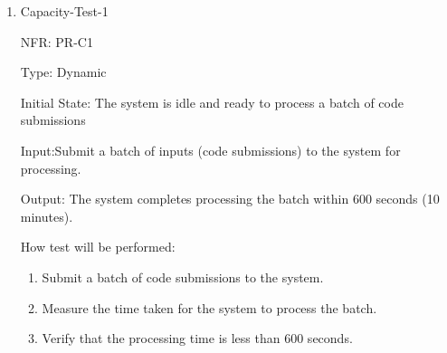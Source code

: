 \documentclass[12pt, titlepage]{article}
\begin{document}
\begin{enumerate}
  \item{Capacity-Test-1}
  
  NFR: PR-C1

  Type: Dynamic

  Initial State: The system is idle and ready to process a batch of code submissions

  Input:Submit a batch of inputs (code submissions) to the system for processing.

  Output: The system completes processing the batch within 600 seconds (10 minutes).

  How test will be performed:

  \begin{enumerate}
    \item Submit a batch of code submissions to the system.
    \item Measure the time taken for the system to process the batch.
    \item Verify that the processing time is less than 600 seconds.
  \end{enumerate}
\end{enumerate}
\end{document}
